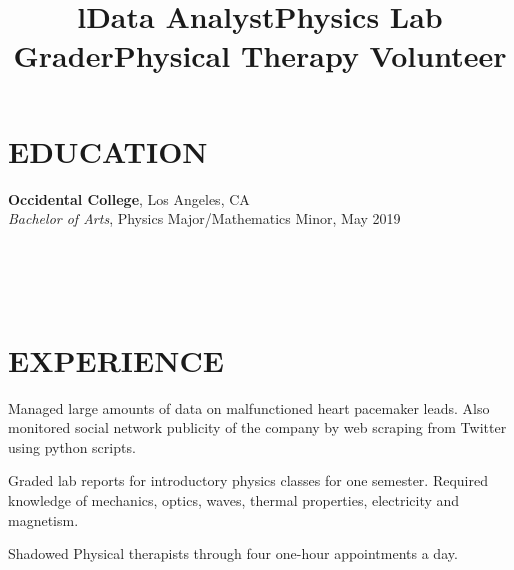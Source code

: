 \documentclass[margin]{res}
\begin{document}
\begin{resume}

\section{EDUCATION}
\textbf{Occidental College}, Los Angeles, CA\\
{\sl Bachelor of Arts}, Physics Major/Mathematics Minor, May 2019\hfill 


\begin{format}
\title{l}\\
\\
\body\\
\end{format}

\section{EXPERIENCE}
\title{\textbf{Data Analyst}}
\begin{position}
	Managed large amounts of data on malfunctioned heart pacemaker leads. Also monitored social network publicity of the company by web scraping from Twitter using python scripts.
\end{position}

\title{\textbf{Physics Lab Grader}}
\begin{position}
	Graded lab reports for introductory physics classes for one semester. Required knowledge of mechanics, optics, waves, thermal properties, electricity and magnetism.
\end{position}

\title{\textbf{Physical Therapy Volunteer}}
\begin{position}
	Shadowed Physical therapists through four one-hour appointments a day.
\end{position}


\end{resume}
\end{document}
